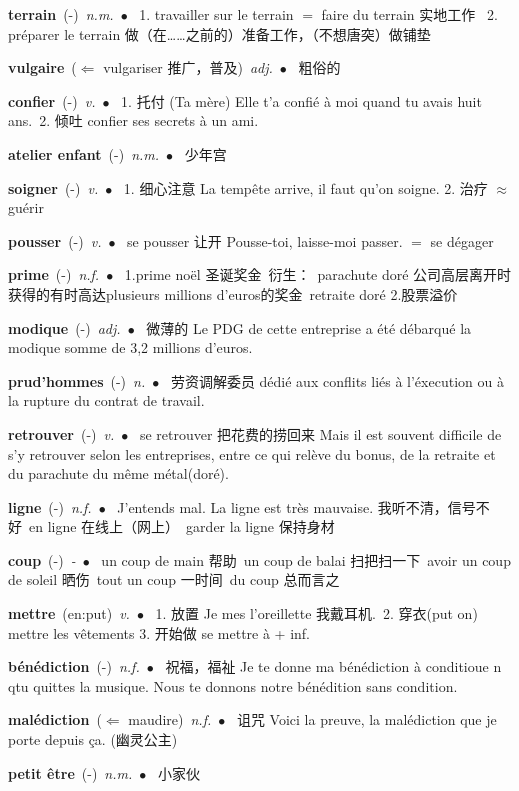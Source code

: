 \documentclass[10pt,a4paper,twoside]{article} %
\newcommand{\entry}[4]{\textbf{#1}\ {(#2)}\ \textit{#3}\ $\bullet$\ {#4}} %
\begin{document}
\begin{CJK*}{UTF8}{gkai}
\begin{multicols}{2}
\entry{terrain}{-}{n.m.}
{
1. travailler sur le terrain $=$ faire du terrain 实地工作 \ 
2. préparer le terrain 做（在……之前的）准备工作，（不想唐突）做铺垫 
}

\entry{vulgaire}{$\Leftarrow$ vulgariser 推广，普及}{adj.}
{
粗俗的
}

\entry{confier}{-}{v.}
{
1. 托付 (Ta mère) Elle t'a confié à moi quand tu avais huit ans.\ 
2. 倾吐 confier ses secrets à un ami.
}

\entry{atelier enfant}{-}{n.m.}
{
少年宫
}

\entry{soigner}{-}{v.}
{
1. 细心注意 La tempête arrive, il faut qu'on soigne.
2. 治疗 $\approx$ guérir
}

\entry{pousser}{-}{v.}
{
se pousser 让开 Pousse-toi, laisse-moi passer. $=$ se dégager
}

\entry{prime}{-}{n.f.}
{
1.prime noël 圣诞奖金\ 
衍生：\ 
parachute doré 公司高层离开时获得的有时高达plusieurs millions d'euros的奖金\ 
retraite doré
2.股票溢价
}

\entry{modique}{-}{adj.}
{
微薄的 Le PDG de cette entreprise a été débarqué la modique somme de 3,2 millions d'euros.
}

\entry{prud'hommes}{-}{n.}
{
劳资调解委员 dédié aux conflits liés à l'éxecution ou à la rupture du contrat de travail.
}

\entry{retrouver}{-}{v.}
{
se retrouver 把花费的捞回来 Mais il est souvent difficile de s'y retrouver selon les entreprises, entre 
ce qui relève du bonus, de la retraite et du parachute du même métal(doré).
}

\entry{ligne}{-}{n.f.}
{
J'entends mal. La ligne est très mauvaise. 我听不清，信号不好\ 
en ligne 在线上（网上）\ garder la ligne 保持身材
}

\entry{coup}{-}{-}
{
un coup de main 帮助\ un coup de balai 扫把扫一下\ avoir un coup de soleil 晒伤\ 
tout un coup 一时间\ du coup 总而言之\ 
}

\entry{mettre}{en:put}{v.}
{
1. 放置 Je mes l'oreillette 我戴耳机.\ 
2. 穿衣(put on) mettre les vêtements
3. 开始做 se mettre à + inf.
}

\entry{bénédiction}{-}{n.f.}
{
祝福，福祉 Je te donne ma bénédiction à conditioue n qtu quittes la musique. Nous te donnons notre bénédition sans condition.
}

\entry{malédiction}{$\Leftarrow$ maudire}{n.f.}
{
诅咒 Voici la preuve, la malédiction que je porte depuis ça. (幽灵公主)
}

\entry{petit être}{-}{n.m.}
{
小家伙
}


\end{multicols}
\end{CJK*}
\end{document}
